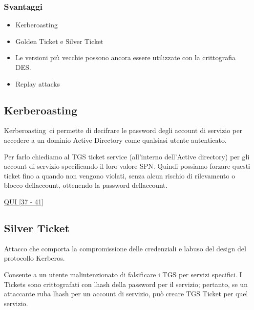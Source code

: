 \documentclass[
]{article}
\providecommand{\tightlist}{%
  \setlength{\itemsep}{0pt}\setlength{\parskip}{0pt}}
\begin{document}
\subsubsection{\texorpdfstring{{Svantaggi}}{Svantaggi}}\label{h.d1ir5egkocqq}

\begin{itemize}
\tightlist
\item
  {Kerberoasting}{~}
\item
  {Golden Ticket e Silver Ticket }
\item
  {Le versioni più vecchie possono ancora essere utilizzate con la
  crittografia DES. }
\item
  {Replay attacks }
\end{itemize}

\subsection{\texorpdfstring{{Kerberoasting}}{Kerberoasting}}\label{h.vr59dm2w2e8}

{Kerberoasting}{~ci permette di decifrare le password degli account di
servizio per accedere a un dominio Active Directory come qualsiasi
utente autenticato.}

{Per farlo chiediamo al TGS ticket service (all'interno dell'Active
directory) per gli account di servizio specificando il loro valore SPN.
Quindi possiamo forzare questi ticket fino a quando non vengono violati,
senza alcun rischio di rilevamento o blocco
dell\textquotesingle account, ottenendo la password
dell\textquotesingle account.}

{}

{\href{https://www.google.com/url?q=https://virtuale.unibo.it/pluginfile.php/2023963/mod_resource/content/1/Laboratorio\%2520di\%2520sicurezza\%2520dei\%2520sistemi\%2520informatici\%2520e\%2520privacy\%2520-\%252002\%2520Active\%2520Directory\%2520Security\%2520-\%2520V1R0.pdf&sa=D&source=editors&ust=1734628852099535&usg=AOvVaw35pStrAiFzG1MzxltoITjS}{QUI
{[}37 - 41{]}}}

\subsection{\texorpdfstring{{Silver
Ticket}}{Silver Ticket}}\label{h.t2ow9l4zg9y1}

{Attacco che comporta la compromissione delle credenziali e
l\textquotesingle abuso del design del protocollo Kerberos. }

{Consente a un utente malintenzionato di falsificare i TGS per servizi
specifici. I Tickets sono crittografati con l\textquotesingle hash della
password per il servizio; pertanto, se un attaccante ruba
l\textquotesingle hash per un account di servizio, può creare TGS Ticket
per quel servizio. }
\end{document}
